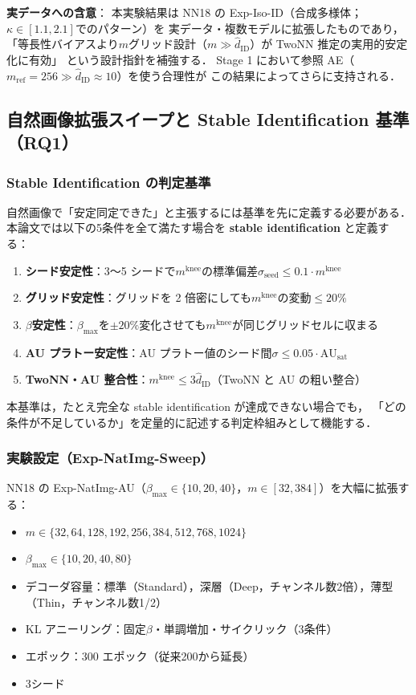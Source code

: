 \documentclass[11pt,a4paper]{jsarticle}
\newcommand{\kap}{\kappa}
\newcommand{\AUsat}{\mathrm{AU}_{\mathrm{sat}}}
\newcommand{\mknee}{m^{\mathrm{knee}}}
\begin{document}
\textbf{実データへの含意}：
本実験結果は NN18 の Exp-Iso-ID（合成多様体；$\kap \in [1.1,2.1]$でのパターン）を
実データ・複数モデルに拡張したものであり，
「等長性バイアスより$m$グリッド設計（$m \gg \hat{d}_\mathrm{ID}$）が TwoNN 推定の実用的安定化に有効」
という設計指針を補強する．
Stage 1 において参照 AE（$m_\mathrm{ref}=256 \gg \hat{d}_\mathrm{ID} \approx 10$）を使う合理性が
この結果によってさらに支持される．

\subsection{自然画像拡張スイープと Stable Identification 基準（RQ1）}\label{sec:exp_natimg_sweep}

\subsubsection*{Stable Identification の判定基準}\label{sec:natimg_stable_id}

自然画像で「安定同定できた」と主張するには基準を先に定義する必要がある．
本論文では以下の5条件を全て満たす場合を \textbf{stable identification} と定義する：

\begin{enumerate}
  \item \textbf{シード安定性}：3〜5 シードで$\mknee$の標準偏差$\sigma_\mathrm{seed} \leq 0.1 \cdot \mknee$
  \item \textbf{グリッド安定性}：グリッドを 2 倍密にしても$\mknee$の変動$\leq 20\%$
  \item \textbf{$\beta$安定性}：$\beta_{\max}$を$\pm 20\%$変化させても$\mknee$が同じグリッドセルに収まる
  \item \textbf{AU プラトー安定性}：AU プラトー値のシード間$\sigma \leq 0.05 \cdot \AUsat$
  \item \textbf{TwoNN・AU 整合性}：$\mknee \leq 3 \hat{d}_\mathrm{ID}$（TwoNN と AU の粗い整合）
\end{enumerate}

本基準は，たとえ完全な stable identification が達成できない場合でも，
「どの条件が不足しているか」を定量的に記述する判定枠組みとして機能する．

\subsubsection*{実験設定（Exp-NatImg-Sweep）}

NN18 の Exp-NatImg-AU（$\beta_{\max} \in \{10,20,40\}$，$m \in [32,384]$）を大幅に拡張する：
\begin{itemize}
  \item $m \in \{32, 64, 128, 192, 256, 384, 512, 768, 1024\}$
  \item $\beta_{\max} \in \{10, 20, 40, 80\}$
  \item デコーダ容量：標準（Standard），深層（Deep，チャンネル数2倍），薄型（Thin，チャンネル数1/2）
  \item KL アニーリング：固定$\beta$・単調増加・サイクリック（3条件）
  \item エポック：300 エポック（従来200から延長）
  \item 3シード
\end{itemize}
\end{document}
